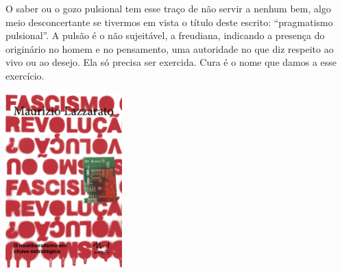 \noindent{}O saber ou o gozo pulsional tem esse traço de não servir a nenhum bem, algo meio desconcertante se tivermos em vista o título deste escrito: “pragmatismo pulsional”. A pulsão é o não sujeitável, a {} freudiana, indicando a presença do originário no homem e no pensamento, uma autoridade no que diz respeito ao vivo ou ao desejo. Ela só precisa ser exercida. Cura é o nome que damos a esse exercício.

\vfill

\hspace*{-.4cm}\begin{minipage}[c]{1\linewidth}
\small{
{}}
\end{minipage}

\pagebreak

\hspace{.5cm}

\begin{center}
\hspace*{-2.5cm}
\hspace*{2cm}\includegraphics[width=45mm]{./imgs/lazzarato.jpg}
\end{center}

\hspace*{-7cm}\hrulefill\hspace*{-7cm}

\medskip

